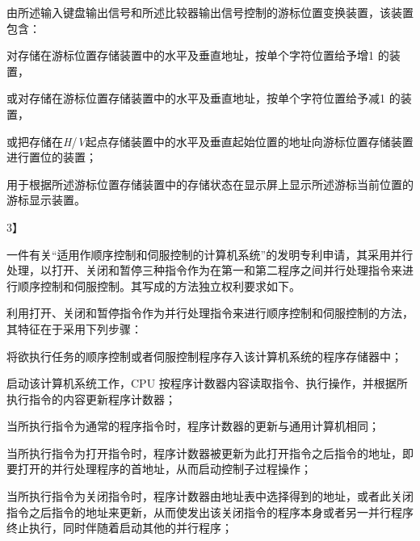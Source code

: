 {\setlength{\parindent}{20.6bp}由所述输入键盘输出信号和所述比较器输出信号控制的游标位置变换装置，该装置包含：\par}

{\setlength{\parindent}{20.6bp}对存储在游标位置存储装置中的水平及垂直地址，按单个字符位置给予增1 的装置，\par}

{\setlength{\parindent}{20.6bp}或对存储在游标位置存储装置中的水平及垂直地址，按单个字符位置给予减1 的装置，\par}

{\setlength{\parindent}{20.6bp}或把存储在\textit{H}/\textit{V}起点存储装置中的水平及垂直起始位置的地址向游标位置存储装置进行置位的装置；\par}

{\setlength{\parindent}{20.6bp}用于根据所述游标位置存储装置中的存储状态在显示屏上显示所述游标当前位置的游标显示装置。\par}

{3】\par}

{\setlength{\parindent}{20.6bp}一件有关“适用作顺序控制和伺服控制的计算机系统”的发明专利申请，其采用并行处理，以打开、关闭和暂停三种指令作为在第一和第二程序之间并行处理指令来进行顺序控制和伺服控制。其写成的方法独立权利要求如下。\par}

{\setlength{\parindent}{20.6bp}利用打开、关闭和暂停指令作为并行处理指令来进行顺序控制和伺服控制的方法，其特征在于采用下列步骤：\par}

{\setlength{\parindent}{20.6bp}将欲执行任务的顺序控制或者伺服控制程序存入该计算机系统的程序存储器中；\par}

{\setlength{\parindent}{20.6bp}启动该计算机系统工作，CPU 按程序计数器内容读取指令、执行操作，并根据所执行指令的内容更新程序计数器；\par}

{\setlength{\parindent}{20.6bp}当所执行指令为通常的程序指令时，程序计数器的更新与通用计算机相同；\par}

{\setlength{\parindent}{20.6bp}当所执行指令为打开指令时，程序计数器被更新为此打开指令之后指令的地址，即要打开的并行处理程序的首地址，从而启动控制子过程操作；\par}

{\setlength{\parindent}{20.6bp}当所执行指令为关闭指令时，程序计数器由地址表中选择得到的地址，或者此关闭指令之后指令的地址来更新，从而使发出该关闭指令的程序本身或者另一并行程序终止执行，同时伴随着启动其他的并行程序；\par}

